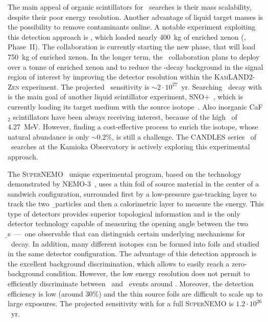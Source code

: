\begin{description}[wide]
  \item[Scintillators] The main appeal of organic scintillators for \onbb\ searches is
    their mass scalability, despite their poor energy resolution.  Another advantage of
    liquid target masses is the possibility to remove contaminants online. A notable
    experiment exploiting this detection approach is \kamlandzen, which loaded nearly
    400~kg of enriched xenon (, Phase~II). The collaboration is currently
    starting the new  phase, that will load 750~kg of enriched xenon. In
    the longer term, the \kamlandzen\ collaboration plans to deploy over a tonne of
    enriched xenon and to reduce the \nnbb-decay background in the signal region of
    interest by improving the detector resolution within the \textsc{KamLAND2-Zen}
    experiment. The projected \thalfzero\ sensitivity is $\sim$$2 \cdot 10^{27}$~yr.
    Searching \onbb\ decay with  is the main goal of another liquid
    scintillator experiment, SNO+~\cite{Andringa2015}, which is currently loading its
    target medium with the source isotope~\cite{Paton2019}. Also inorganic CaF$_2$
    scintillators have been always receiving interest, because of the high 
    \qbb\ of 4.27~MeV. However, finding a cost-effective process to enrich the isotope,
    whose natural abundance is only $\sim$0.2\%, is still a challenge. The CANDLES
    series~\cite{Umehara2015} of \onbb\ searches at the Kamioka Observatory is actively
    exploring this experimental approach.

  \item[Tracking Calorimeters] The \textsc{SuperNEMO}~\cite{Arnold2010} unique
    experimental program, based on the technology demonstrated by
    NEMO-3~\cite{Arnold2004}, uses a thin foil of source material in the center of a
    sandwich configuration, surrounded first by a low-pressure gas-tracking layer to track
    the two \b\ particles and then a calorimetric layer to measure the energy. This type
    of detectors provides superior topological information and is the only detector
    technology capable of measuring the opening angle between the two {\b}s~---~one
    observable that can distinguish certain underlying mechanisms for \onbb\ decay. In
    addition, many different isotopes can be formed into foils and studied in the same
    detector configuration. The advantage of this detection approach is the excellent
    background discrimination, which allows to easily reach a zero-background condition.
    However, the low energy resolution does not permit to efficiently discriminate between
    \nnbb\ and \onbb\ events around \qbb. Moreover, the detection efficiency is low
    (around 30\%) and the thin source foils are difficult to scale up to large exposures.
    The projected sensitivity with  for a full \textsc{SuperNEMO} is $1.2
    \cdot 10^{26}$~yr.

\end{description}

